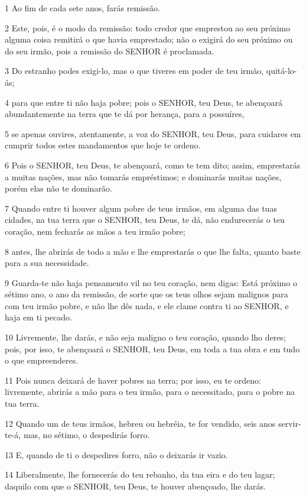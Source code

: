 \par 1 Ao fim de cada sete anos, farás remissão.
\par 2 Este, pois, é o modo da remissão: todo credor que emprestou ao seu próximo alguma coisa remitirá o que havia emprestado; não o exigirá do seu próximo ou do seu irmão, pois a remissão do SENHOR é proclamada.
\par 3 Do estranho podes exigi-lo, mas o que tiveres em poder de teu irmão, quitá-lo-ás;
\par 4 para que entre ti não haja pobre; pois o SENHOR, teu Deus, te abençoará abundantemente na terra que te dá por herança, para a possuíres,
\par 5 se apenas ouvires, atentamente, a voz do SENHOR, teu Deus, para cuidares em cumprir todos estes mandamentos que hoje te ordeno.
\par 6 Pois o SENHOR, teu Deus, te abençoará, como te tem dito; assim, emprestarás a muitas nações, mas não tomarás empréstimos; e dominarás muitas nações, porém elas não te dominarão.
\par 7 Quando entre ti houver algum pobre de teus irmãos, em alguma das tuas cidades, na tua terra que o SENHOR, teu Deus, te dá, não endurecerás o teu coração, nem fecharás as mãos a teu irmão pobre;
\par 8 antes, lhe abrirás de todo a mão e lhe emprestarás o que lhe falta, quanto baste para a sua necessidade.
\par 9 Guarda-te não haja pensamento vil no teu coração, nem digas: Está próximo o sétimo ano, o ano da remissão, de sorte que os teus olhos sejam malignos para com teu irmão pobre, e não lhe dês nada, e ele clame contra ti ao SENHOR, e haja em ti pecado.
\par 10 Livremente, lhe darás, e não seja maligno o teu coração, quando lho deres; pois, por isso, te abençoará o SENHOR, teu Deus, em toda a tua obra e em tudo o que empreenderes.
\par 11 Pois nunca deixará de haver pobres na terra; por isso, eu te ordeno: livremente, abrirás a mão para o teu irmão, para o necessitado, para o pobre na tua terra.
\par 12 Quando um de teus irmãos, hebreu ou hebréia, te for vendido, seis anos servir-te-á, mas, no sétimo, o despedirás forro.
\par 13 E, quando de ti o despedires forro, não o deixarás ir vazio.
\par 14 Liberalmente, lhe fornecerás do teu rebanho, da tua eira e do teu lagar; daquilo com que o SENHOR, teu Deus, te houver abençoado, lhe darás.
